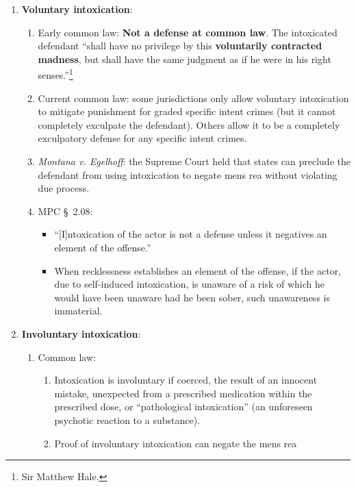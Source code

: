 \begin{enumerate}
    \item \textbf{Voluntary intoxication}:
        \begin{enumerate}
            \item Early common law: \textbf{Not a defense at common law}. The intoxicated 
            defendant ``shall have no privilege by this \textbf{voluntarily 
            contracted madness}, but shall have the same judgment as if he 
            were in his right senses.''\footnote{Sir Matthew Hale.}
            \item Current common law: some jurisdictions only allow voluntary 
            intoxication to mitigate punishment for graded specific intent 
            crimes (but it cannot completely exculpate the defendant). Others 
            allow it to be a completely exculpatory defense for any specific 
            intent crimes.
            \item \emph{Montana v. Egelhoff}: the Supreme Court held that 
            states can preclude the defendant from using intoxication to 
            negate mens rea without violating due process.
            \item MPC \S\ 2.08:
            \begin{itemize}
                \item ``[I]ntoxication of the actor is not a defense unless it 
                negatives an element of the offense.''
                \item When recklessness establishes an element of the offense, if the 
                actor, due to self-induced intoxication, is unaware of a risk of which 
                he would have been unaware had he been sober, such unawareness is 
                immaterial.
            \end{itemize}
        \end{enumerate}
    \item \textbf{Involuntary intoxication}:
    \begin{enumerate}
        \item Common law:
        \begin{enumerate}
            \item Intoxication is involuntary if coerced, the result of an 
            innocent mistake, unexpected from a prescribed medication within 
            the prescribed dose, or ``pathological intoxication'' (an 
            unforeseen psychotic reaction to a substance). 
            \item Proof of involuntary intoxication can negate the mens rea 

\end{enumerate}
\end{enumerate}
\end{enumerate}
